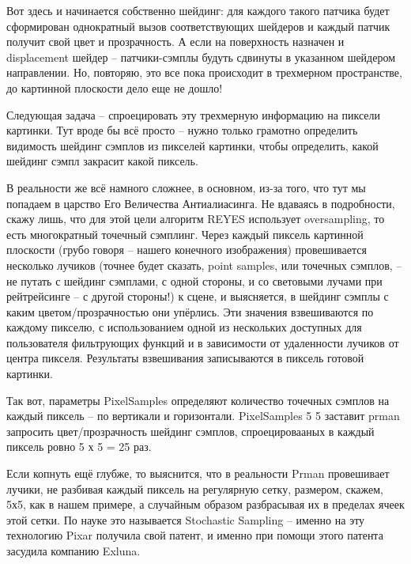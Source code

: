  Вот здесь и начинается собственно шейдинг: для
    каждого такого патчика будет сформирован  однократный вызов соответствующих
    шейдеров и каждый патчик получит свой цвет и прозрачность. А если
    на поверхность назначен и displacement шейдер – патчики-сэмплы
    будуть сдвинуты в  указанном шейдером направлении. Но, повторяю, это все пока
    происходит в трехмерном пространстве, до картинной плоскости дело
    еще не дошло!
  

 Следующая задача – спроецировать эту трехмерную
    информацию на пиксели картинки. Тут вроде бы всё просто – нужно
    только грамотно определить видимость шейдинг сэмплов из пикселей
    картинки, чтобы определить, какой шейдинг сэмпл закрасит какой
    пиксель.
  

 В реальности же всё намного сложнее, в основном,
    из-за того, что тут мы попадаем в царство Его Величества
    Антиалиасинга. Не вдаваясь в подробности, скажу лишь, что
    для  этой цели алгоритм
    REYES использует oversampling, то есть многократный точечный
    сэмплинг. Через каждый пиксель картинной плоскости (грубо говоря –
    нашего конечного изображения) провешивается несколько лучиков
    (точнее будет сказать, point samples, или точечных сэмплов, – не
    путать с шейдинг сэмплами, с одной стороны, и со световыми лучами
    при рейтрейсинге – с другой стороны!) к сцене, и выясняется, в
    шейдинг сэмплы с каким цветом/прозрачностью они упёрлись. Эти
    значения взвешиваются по каждому пикселю, с использованием одной из
    нескольких доступных для пользователя фильтрующих функций и в
    зависимости от удаленности лучиков от центра пикселя. Результаты
    взвешивания записываются в пиксель готовой картинки.
  

 Так вот, параметры PixelSamples определяют
    количество точечных сэмплов на каждый пиксель – по вертикали и
    горизонтали. PixelSamples 5 5 заставит prman запросить
    цвет/прозрачность шейдинг сэмплов, спроецировааных в каждый пиксель
    ровно 5 х 5 = 25 раз.
  

 Если копнуть ещё глубже, то выяснится, что в
    реальности Prman провешивает лучики, не разбивая каждый пиксель на
    регулярную сетку, размером, скажем, 5х5, как в нашем примере, а
    случайным образом разбрасывая их в пределах ячеек этой сетки. По
    науке это называется Stochastic Sampling – именно на эту технологию
    Pixar получила свой патент, и именно при помощи этого патента
    засудила компанию Exluna.
  


